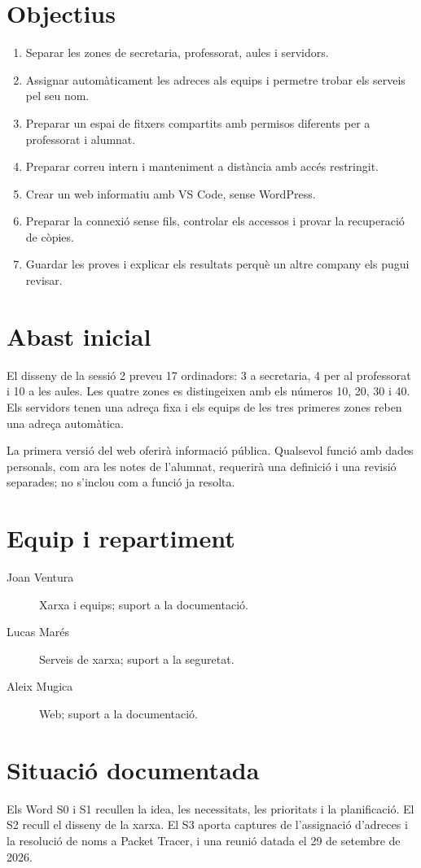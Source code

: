 \documentclass[11pt,a4paper]{report}
\begin{document}
\section{Objectius}
\begin{enumerate}
\item Separar les zones de secretaria, professorat, aules i servidors.
\item Assignar automàticament les adreces als equips i permetre trobar els serveis pel seu nom.
\item Preparar un espai de fitxers compartits amb permisos diferents per a professorat i alumnat.
\item Preparar correu intern i manteniment a distància amb accés restringit.
\item Crear un web informatiu amb VS Code, sense WordPress.
\item Preparar la connexió sense fils, controlar els accessos i provar la recuperació de còpies.
\item Guardar les proves i explicar els resultats perquè un altre company els pugui revisar.
\end{enumerate}
\section{Abast inicial}
El disseny de la sessió 2 preveu 17 ordinadors: 3 a secretaria, 4 per al professorat i 10 a les aules. Les quatre zones es distingeixen amb els números 10, 20, 30 i 40. Els servidors tenen una adreça fixa i els equips de les tres primeres zones reben una adreça automàtica.

La primera versió del web oferirà informació pública. Qualsevol funció amb dades personals, com ara les notes de l'alumnat, requerirà una definició i una revisió separades; no s'inclou com a funció ja resolta.
\section{Equip i repartiment}
\begin{description}
\item[Joan Ventura] Xarxa i equips; suport a la documentació.
\item[Lucas Marés] Serveis de xarxa; suport a la seguretat.
\item[Aleix Mugica] Web; suport a la documentació.
\end{description}
\section{Situació documentada}
Els Word S0 i S1 recullen la idea, les necessitats, les prioritats i la planificació. El S2 recull el disseny de la xarxa. El S3 aporta captures de l'assignació d'adreces i la resolució de noms a Packet Tracer, i una reunió datada el 29 de setembre de 2026.
\end{document}
